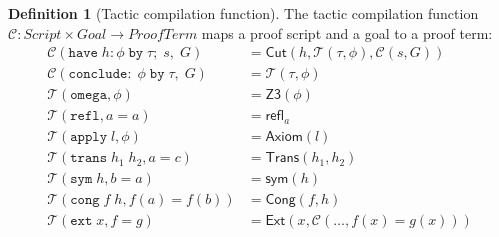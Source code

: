 \documentclass[11pt,a4paper]{report}
\theoremstyle{definition}
\newtheorem{definition}{Definition}[chapter]
\theoremstyle{plain}
\newcommand{\Refl}{\mathsf{refl}}
\newcommand{\sym}{\mathsf{sym}}
\newcommand{\Ext}{\mathsf{Ext}}
\newcommand{\Cut}{\mathsf{Cut}}
\newcommand{\Trans}{\mathsf{Trans}}
\newcommand{\Cong}{\mathsf{Cong}}
\begin{document}
\begin{definition}[Tactic compilation function]
\label{def:tactic-compile}
The tactic compilation function $\mathcal{C} : \mathit{Script} \times \mathit{Goal}
\to \mathit{ProofTerm}$ maps a proof script and a goal to a proof term:
\begin{align}
  \mathcal{C}(\mathtt{have}\;h\!:\!\phi\;\mathtt{by}\;\tau;\; s,\; G) &=
    \Cut(h, \mathcal{T}(\tau, \phi), \mathcal{C}(s, G)) \\
  \mathcal{C}(\mathtt{conclude:}\;\phi\;\mathtt{by}\;\tau,\; G) &=
    \mathcal{T}(\tau, \phi) \\
  \mathcal{T}(\mathtt{omega}, \phi) &= \mathsf{Z3}(\phi) \\
  \mathcal{T}(\mathtt{refl}, a = a) &= \Refl_a \\
  \mathcal{T}(\mathtt{apply}\;l, \phi) &= \mathsf{Axiom}(l) \\
  \mathcal{T}(\mathtt{trans}\;h_1\;h_2, a = c) &= \Trans(h_1, h_2) \\
  \mathcal{T}(\mathtt{sym}\;h, b = a) &= \sym(h) \\
  \mathcal{T}(\mathtt{cong}\;f\;h, f(a) = f(b)) &= \Cong(f, h) \\
  \mathcal{T}(\mathtt{ext}\;x, f = g) &= \Ext(x, \mathcal{C}(\ldots, f(x) = g(x)))
\end{align}
\end{definition}
\end{document}
